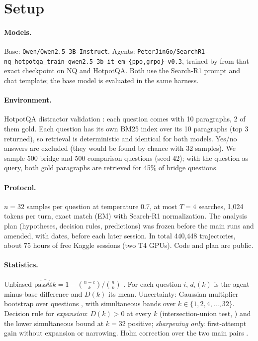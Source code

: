 \documentclass[11pt]{article}
\makeatletter
\newcommand{\passk}{\mathrm{pass@}k}
\makeatother
\begin{document}
\section{Setup}\label{sec:setup}

\paragraph{Models.} Base: \texttt{Qwen/Qwen2.5-3B-Instruct}. Agents: \texttt{PeterJinGo/SearchR1-nq\_hotpotqa\_train-qwen2.5-3b-it-em-\{ppo,grpo\}-v0.3}, trained by \citet{jin2025search} from that exact checkpoint on NQ and HotpotQA. Both use the Search-R1 prompt and chat template; the base model is evaluated in the same harness.

\paragraph{Environment.} HotpotQA distractor validation \citep{yang2018hotpotqa}: each question comes with 10 paragraphs, 2 of them gold. Each question has its own BM25 index over its 10 paragraphs (top 3 returned), so retrieval is deterministic and identical for both models. Yes/no answers are excluded (they would be found by chance with 32 samples). We sample 500 bridge and 500 comparison questions (seed 42); with the question as query, both gold paragraphs are retrieved for 45\% of bridge questions.

\paragraph{Protocol.} $n = 32$ samples per question at temperature 0.7, at most $T = 4$ searches, 1{,}024 tokens per turn, exact match (EM) with Search-R1 normalization. The analysis plan (hypotheses, decision rules, predictions) was frozen before the main runs and amended, with dates, before each later session. In total 440{,}448 trajectories, about 75 hours of free Kaggle sessions (two T4 GPUs). Code and plan are public.

\paragraph{Statistics.} Unbiased $\widehat{\passk} = 1 - \binom{n-c}{k}/\binom{n}{k}$ \citep{chen2021evaluating}. For each question $i$, $d_i(k)$ is the agent-minus-base difference and $D(k)$ its mean. Uncertainty: Gaussian multiplier bootstrap over questions \citep{chernozhukov2013gaussian}, with simultaneous bands over $k \in \{1,2,4,\dots,32\}$. Decision rule for \emph{expansion}: $D(k) > 0$ at every $k$ (intersection-union test, \citealp{berger1982multiparameter}) and the lower simultaneous bound at $k = 32$ positive; \emph{sharpening only}: first-attempt gain without expansion or narrowing. Holm correction over the two main pairs \citep{holm1979simple}.
\end{document}
